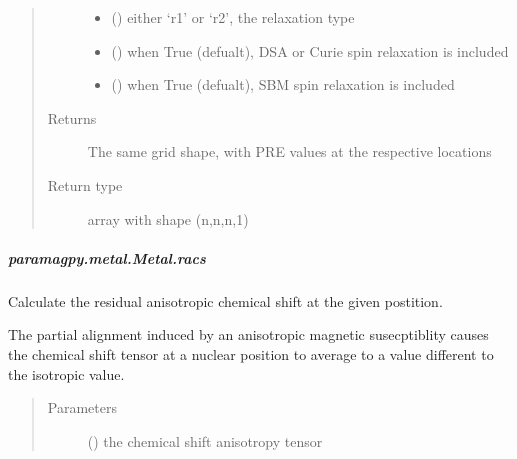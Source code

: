 \documentclass[a4paper,10pt,english]{sphinxmanual}
\begin{document}
\begin{fulllineitems}
\begin{fulllineitems}
\begin{fulllineitems}
\begin{quote}
\begin{description}
\begin{itemize}
\item {} 
 () \textendash{} either ‘r1’ or ‘r2’, the relaxation type

\item {} 
 (\sphinxstyleliteralemphasis{\sphinxupquote{ (}}\sphinxstyleliteralemphasis{\sphinxupquote{)}}) \textendash{} when True (defualt), DSA or Curie spin relaxation is included

\item {} 
 (\sphinxstyleliteralemphasis{\sphinxupquote{ (}}\sphinxstyleliteralemphasis{\sphinxupquote{)}}) \textendash{} when True (defualt), SBM spin relaxation is included

\end{itemize}

\item[{Returns}] \leavevmode
{} \textendash{} The same grid shape, with PRE values at the respective locations

\item[{Return type}] \leavevmode
array with shape (n,n,n,1)

\end{description}\end{quote}

\end{fulllineitems}



\subparagraph{paramagpy.metal.Metal.racs}
\label{\detokenize{reference/generated/paramagpy.metal.Metal.racs:paramagpy-metal-metal-racs}}\label{\detokenize{reference/generated/paramagpy.metal.Metal.racs::doc}}

\begin{fulllineitems}
\label{\detokenize{reference/generated/paramagpy.metal.Metal.racs:paramagpy.metal.Metal.racs}}
Calculate the residual anisotropic chemical shift at the
given postition.

The partial alignment induced by an anisotropic
magnetic susecptiblity causes the chemical shift tensor at a nuclear
position to average to a value different to the isotropic value.
\begin{quote}\begin{description}
\item[{Parameters}] \leavevmode
{} () \textendash{} the chemical shift anisotropy tensor


\end{description}
\end{quote}
\end{fulllineitems}
\end{fulllineitems}
\end{fulllineitems}
\end{document}
